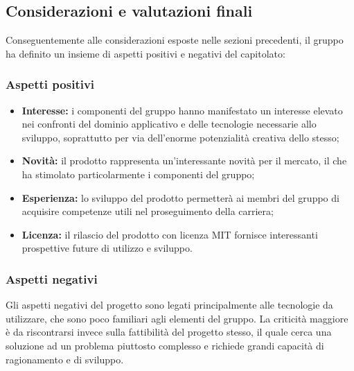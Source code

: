   \subsection{Considerazioni e valutazioni finali}
    Conseguentemente alle considerazioni esposte nelle sezioni precedenti, il gruppo ha definito un
    insieme di aspetti positivi e negativi del capitolato:
    \subsubsection{Aspetti positivi}
      \begin{itemize}
        \item \textbf{Interesse:} i componenti del gruppo hanno manifestato un interesse elevato nei confronti del dominio applicativo e delle tecnologie necessarie
        allo sviluppo, soprattutto per via dell'enorme potenzialità creativa dello stesso;
        \item \textbf{Novità:} il prodotto rappresenta un'interessante novità per il mercato, il che ha stimolato particolarmente i componenti del gruppo;
        \item \textbf{Esperienza:} lo sviluppo del prodotto permetterà ai membri del gruppo di acquisire competenze utili nel proseguimento della carriera;
        \item \textbf{Licenza:} il rilascio del prodotto con licenza MIT fornisce interessanti
         prospettive future di utilizzo e sviluppo.
     \end{itemize}
   \subsubsection{Aspetti negativi}
    Gli aspetti negativi del progetto sono legati principalmente alle tecnologie da utilizzare, che sono poco familiari agli elementi del gruppo.
    La criticità maggiore è da riscontrarsi invece sulla fattibilità del progetto stesso, il quale cerca una soluzione ad un problema piuttosto complesso e richiede grandi
    capacità di ragionamento e di sviluppo.
